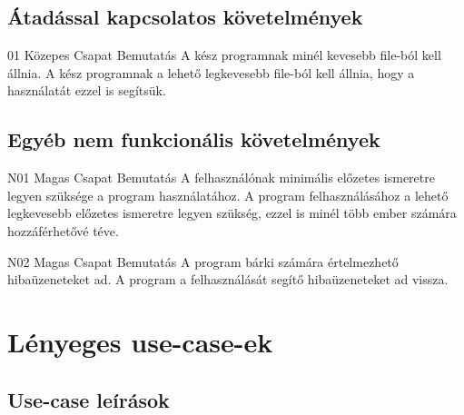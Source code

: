 \documentclass[../../projlab]{subfiles}
\begin{document}
\subsection{Átadással kapcsolatos követelmények}
\begin{kovetelmeny}
    {01} %
    {Közepes} %
    {Csapat} %
    {Bemutatás} %
    {A kész programnak minél kevesebb file-ból kell állnia.} %
	A kész programnak a lehető legkevesebb file-ból kell állnia, hogy a használatát ezzel is segítsük.
\end{kovetelmeny}

\subsection{Egyéb nem funkcionális követelmények}
\begin{kovetelmeny}
    {N01} %
    {Magas} %
    {Csapat} %
    {Bemutatás} %
    {A felhasználónak minimális előzetes ismeretre legyen szüksége a program használatához.} %
	A program felhasználásához a lehető legkevesebb előzetes ismeretre legyen szükség, ezzel is minél több ember számára hozzáférhetővé téve.
\end{kovetelmeny}

\begin{kovetelmeny}
    {N02} %
    {Magas} %
    {Csapat} %
    {Bemutatás} %
    {A program bárki számára értelmezhető hibaüzeneteket ad.} %
	A program a felhasználását segítő hibaüzeneteket ad vissza.
\end{kovetelmeny}

\section{Lényeges use-case-ek}
\subsection{Use-case leírások}
\label{subsec:use_case_desc}
\end{document}
